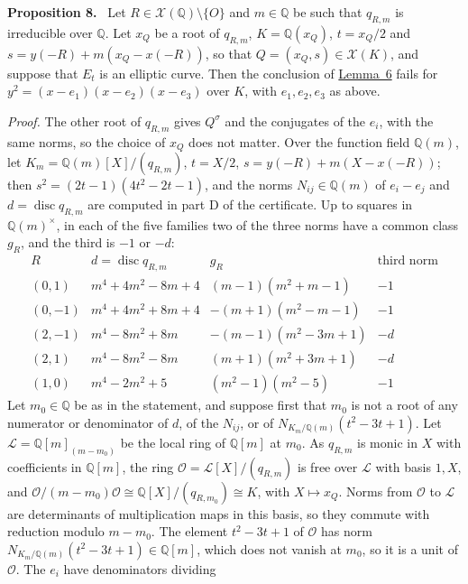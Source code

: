 \documentclass[11pt]{article}
\newenvironment{statement}[1]{\par\medskip\noindent\phantomsection\textbf{#1}\ }{\par\medskip}
\newcommand{\Q}{\mathbb Q}
\DeclareMathOperator{\disc}{disc}
\begin{document}
\begin{statement}{Proposition 8.}\label{prop-families}
Let \(R\in\mathcal X(\Q)\setminus\{O\}\) and \(m\in\Q\) be such that \(q_{R,m}\) is irreducible
over \(\Q\). Let \(x_Q\) be a root of \(q_{R,m}\), \(K=\Q(x_Q)\), \(t=x_Q/2\) and
\(s=y(-R)+m(x_Q-x(-R))\), so that \(Q=(x_Q,s)\in\mathcal X(K)\), and suppose that \(E_t\) is an
elliptic curve. Then the conclusion of \hyperref[lemma-cheb]{Lemma~6} fails for
\(y^2=(x-e_1)(x-e_2)(x-e_3)\) over \(K\), with \(e_1,e_2,e_3\) as above.
\end{statement}

\emph{Proof.} The other root of \(q_{R,m}\) gives \(Q^\sigma\) and the conjugates of the \(e_i\),
with the same norms, so the choice of \(x_Q\) does not matter. Over the function field \(\Q(m)\),
let \(K_m=\Q(m)[X]/(q_{R,m})\),
\(t=X/2\), \(s=y(-R)+m(X-x(-R))\); then \(s^2=(2t-1)(4t^2-2t-1)\), and the norms
\(N_{ij}\in\Q(m)\) of \(e_i-e_j\) and \(d=\disc q_{R,m}\) are computed in part D of the
certificate. Up to squares in \(\Q(m)^\times\), in each of the five families two of the three
norms have a common class \(g_R\), and the third is \(-1\) or \(-d\):
\[
\begin{array}{c|c|c|c}
R & d=\disc q_{R,m} & g_R & \text{third norm}\\\hline
(0,1) & m^4+4m^2-8m+4 & (m-1)(m^2+m-1) & -1\\
(0,-1) & m^4+4m^2+8m+4 & -(m+1)(m^2-m-1) & -1\\
(2,-1) & m^4-8m^2+8m & -(m-1)(m^2-3m+1) & -d\\
(2,1) & m^4-8m^2-8m & (m+1)(m^2+3m+1) & -d\\
(1,0) & m^4-2m^2+5 & (m^2-1)(m^2-5) & -1
\end{array}
\]
Let \(m_0\in\Q\) be as in the statement, and suppose first that \(m_0\) is not a root of any
numerator or denominator of \(d\), of the \(N_{ij}\), or of \(N_{K_m/\Q(m)}(t^2-3t+1)\). Let
\(\mathcal L=\Q[m]_{(m-m_0)}\) be the local ring of \(\Q[m]\) at \(m_0\). As \(q_{R,m}\) is monic in \(X\) with
coefficients in \(\Q[m]\), the ring \(\mathcal O=\mathcal L[X]/(q_{R,m})\) is free over
\(\mathcal L\) with basis \(1,X\), and \(\mathcal O/(m-m_0)\mathcal O\cong\Q[X]/(q_{R,m_0})\cong K\),
with \(X\mapsto x_Q\). Norms from \(\mathcal O\) to \(\mathcal L\) are determinants of
multiplication maps in this basis, so they commute with reduction modulo \(m-m_0\). The element
\(t^2-3t+1\) of \(\mathcal O\) has norm \(N_{K_m/\Q(m)}(t^2-3t+1)\in\Q[m]\), which does not vanish
at \(m_0\), so it is a unit of \(\mathcal O\). The \(e_i\) have denominators dividing
\end{document}
